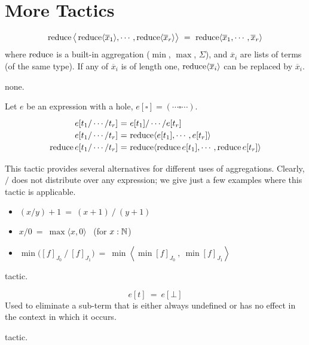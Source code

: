 \section{More Tactics}
\label{annex:more tactics}

\[\operatorname{reduce}\big\langle \operatorname{reduce}\langle\overline x_1\rangle,\cdots, \operatorname{reduce}\langle\overline x_r\rangle\big\rangle ~=~ \operatorname{reduce} \langle \overline x_1, \cdots, \overline x_r\rangle\]
%
where $\operatorname{reduce}$ is a built-in aggregation ($\min$, $\max$, $\Sigma$), 
and $\overline x_i$ are lists of terms (of the same type).
If any of $\overline x_i$ is of length one, $\operatorname{reduce}\langle\overline x_i\rangle$ can be
replaced by $\overline x_i$.

\Obligations none.

\vspace{3mm}
Let $e$ be an expression with a hole, $e[\square] = (\cdots \square \cdots)$.
%
\[\renewcommand\arraystretch{1.2}
  \begin{array}{@{}r@{~}c@{~}l@{}}
    e[t_1/\cdots/t_r] &=& e[t_1] / \cdots / e[t_r] \\
    e[t_1/\cdots/t_r] &=& \reduce\langle e[t_1],\cdots,e[t_r]\rangle \\
    \reduce e[t_1/\cdots/t_r] &=& \reduce\langle \reduce e[t_1],\cdots,\reduce e[t_r]\rangle
  \end{array}\]

This tactic provides several alternatives for different uses of aggregations.
Clearly, $\big/$ does not distribute over any expression; we give just a few examples
where this tactic is applicable.
\begin{itemize}
  \item $(x/y)+1 ~=~ (x+1)~/~(y+1)$
  \item $x/0 ~=~ \max\langle x,0\rangle$ ~(for $x:\mathbb{N}$)
  \item $\min \big([f]_{J_0}~\big/~[f]_{J_1}\big) ~=~
         \min\left\langle \min [f]_{J_0} ~,~ \min [f]_{J_1}\right\rangle$
\end{itemize}

\Obligations tactic.

\[e[t] ~=~ e[\bot]\]
%
Used to eliminate a sub-term that is either always undefined or has no effect
in the context in which it occurs.

\Obligations tactic.

